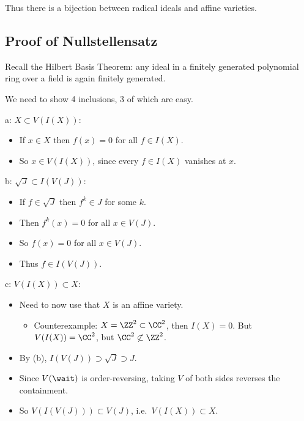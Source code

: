Thus there is a bijection between radical ideals and affine varieties.

\hypertarget{proof-of-nullstellensatz}{%
\subsection{Proof of Nullstellensatz}\label{proof-of-nullstellensatz}}

\begin{remark}

Recall the Hilbert Basis Theorem: any ideal in a finitely generated
polynomial ring over a field is again finitely generated.

\end{remark}

We need to show 4 inclusions, 3 of which are easy.

a: \(X \subset V(I(X))\):

\begin{itemize}
\tightlist
\item
  If \(x\in X\) then \(f(x) = 0\) for all \(f\in I(X)\).
\item
  So \(x\in V(I(X))\), since every \(f\in I(X)\) vanishes at \(x\).
\end{itemize}

b: \(\sqrt{J} \subset I(V(J))\):

\begin{itemize}
\tightlist
\item
  If \(f\in \sqrt{J}\) then \(f^k \in J\) for some \(k\).
\item
  Then \(f^k(x) = 0\) for all \(x\in V(J)\).
\item
  So \(f(x) = 0\) for all \(x\in V(J)\).
\item
  Thus \(f\in I(V(J))\).
\end{itemize}

c: \(V(I(X)) \subset X\):

\begin{itemize}
\tightlist
\item
  Need to now use that \(X\) is an affine variety.

  \begin{itemize}
  \tightlist
  \item
    Counterexample: \(X = \ZZ^2 \subset \CC^2\), then \(I(X) = 0\). But
    \(V(I(X)) = \CC^2\), but \(\CC^2 \not\subset \ZZ^2\).
  \end{itemize}
\item
  By (b), \(I(V(J)) \supset \sqrt{J} \supset J\).
\item
  Since \(V(\wait)\) is order-reversing, taking \(V\) of both sides
  reverses the containment.
\item
  So \(V(I(V(J))) \subset V(J)\), i.e.~\(V(I(X)) \subset X\).
\end{itemize}

